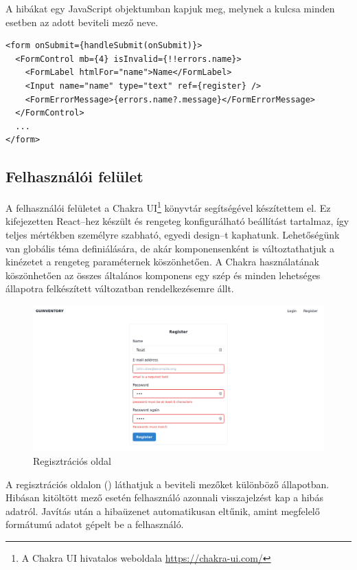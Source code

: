 A hibákat egy JavaScript objektumban kapjuk meg, melynek a kulcsa minden esetben az adott beviteli mező neve.

\begin{lstlisting}[style=ES6]
<form onSubmit={handleSubmit(onSubmit)}>
  <FormControl mb={4} isInvalid={!!errors.name}>
    <FormLabel htmlFor="name">Name</FormLabel>
    <Input name="name" type="text" ref={register} />
    <FormErrorMessage>{errors.name?.message}</FormErrorMessage>
  </FormControl>
  ...
</form>
\end{lstlisting}


\subsection{Felhasználói felület}
A felhasználói felületet a Chakra UI\footnote{A Chakra UI hivatalos weboldala \url{https://chakra-ui.com/}} könyvtár segítségével készítettem el. Ez kifejezetten React–hez készült és rengeteg konfigurálható beállítást tartalmaz, így teljes mértékben személyre szabható, egyedi design–t kaphatunk. Lehetőségünk van globális téma definiálására, de akár komponensenként is változtathatjuk a kinézetet a rengeteg paraméternek köszönhetően.
A Chakra használatának köszönhetően az összes általános komponens egy szép és minden lehetséges állapotra felkészített változatban rendelkezésemre állt.

\begin{figure}[!ht]
  \centering
  \includegraphics[width=150mm, keepaspectratio]{figures/reg.png}
  \caption{Regisztrációs oldal}
  \label{fig:reg}
\end{figure}

A regisztrációs oldalon () láthatjuk a beviteli mezőket különböző állapotban.
Hibásan kitöltött mező esetén felhasználó azonnali visszajelzést kap a hibás adatról.
Javítás után a hibaüzenet automatikusan eltűnik, amint megfelelő formátumú adatot gépelt be a felhasználó.

